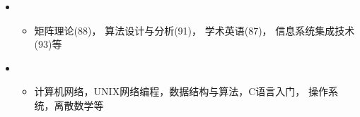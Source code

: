   \begin{itemize}[leftmargin=*]
    \item
      {%
      \begin{itemize}
        \item{	矩阵理论(88)， 	算法设计与分析(91)， 	学术英语(87)， 	信息系统集成技术(93)等}
      \end{itemize}
      }
    \item
      {%
      \begin{itemize}
        \item{计算机网络，UNIX网络编程，数据结构与算法，C语言入门， 操作系统，离散数学等 }
      \end{itemize}
      } 
      
  \end{itemize}
